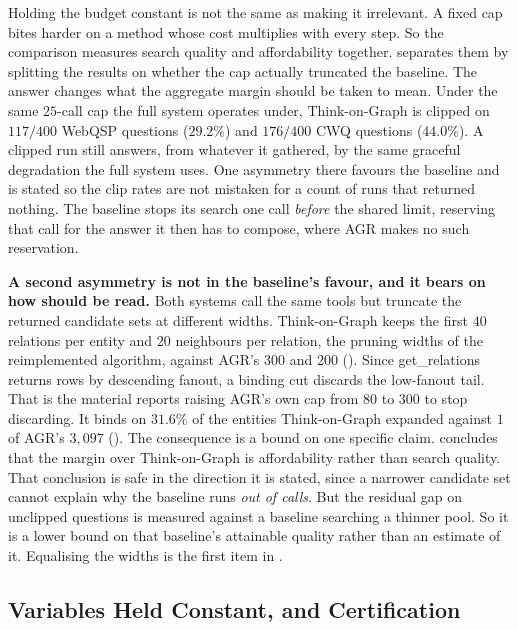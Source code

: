Holding the budget constant is not the same as making it irrelevant. A fixed cap
bites harder on a method whose cost multiplies with every step. So the
comparison measures search quality and affordability together.
 separates them by splitting the results on whether the cap
actually truncated the baseline. The answer changes what the aggregate margin
should be taken to mean. Under the same $25$-call cap the full system operates
under, Think-on-Graph is clipped on $117/400$ WebQSP questions ($29.2\%$) and
$176/400$ CWQ questions ($44.0\%$). A clipped run still answers, from whatever
it gathered, by the same graceful degradation the full system uses. One
asymmetry there favours the baseline and is stated so the clip rates are not
mistaken for a count of runs that returned nothing. The baseline stops its
search one call \emph{before} the shared limit, reserving that call for the
answer it then has to compose, where AGR makes no such reservation.

\textbf{A second asymmetry is not in the baseline's favour, and it bears on how
 should be read.} Both systems call the same tools but
truncate the returned candidate sets at different widths. Think-on-Graph keeps
the first $40$ relations per entity and $20$ neighbours per relation, the
pruning widths of the reimplemented algorithm, against AGR's $300$ and $200$
(). Since \textsf{get\_relations} returns rows by descending
fanout, a binding cut discards the low-fanout tail. That is the material
 reports raising AGR's own cap from $80$ to $300$ to stop
discarding. It binds on $31.6\%$ of the entities Think-on-Graph expanded against
$1$ of AGR's $3{,}097$ (). The consequence is a bound on
one specific claim.  concludes that the margin over
Think-on-Graph is affordability rather than search quality. That conclusion is
safe in the direction it is stated, since a narrower candidate set cannot
explain why the baseline runs \emph{out of calls}. But the residual gap on
unclipped questions is measured against a baseline searching a thinner pool. So
it is a lower bound on that baseline's attainable quality rather than an
estimate of it. Equalising the widths is the first item in
.

\subsection{Variables Held Constant, and
Certification}\label{sec:baseline-constants}

